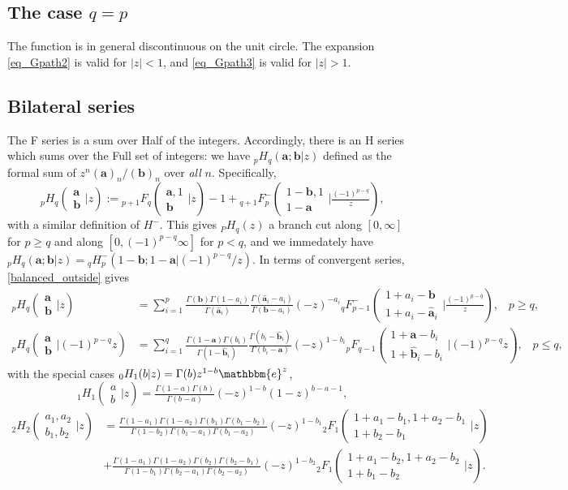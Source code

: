 \documentclass[12pt]{article}
\newcommand{\ee}[0] {\mathbbm{e}}
\numberwithin{equation}{section}
\newcommand{\Head}[3] {{}_{#1}{#2}_{#3}}
\newcommand{\ArgS}[3] {( \begin{smallmatrix} #1 \\ #2 \end{smallmatrix} | {#3})}
\newcommand{\bfa}[0] {\mathbf{a}}
\newcommand{\bfb}[0] {\mathbf{b}}
\begin{document}
\subsection{The case $q=p$}
The function is in general discontinuous on the unit circle. The expansion \eqref{eq_Gpath2} is valid for $|z| < 1$, and \eqref{eq_Gpath3} is valid for $|z| > 1$.



\subsection{Bilateral series}
\label{section_bilateral}
The F series is a sum over Half of the integers. Accordingly, there is an H series which sums over the Full set of integers: we have ${}_p H_q(\bfa; \bfb|z)$ defined as the formal sum of $z^n (\bfa)_n/(\bfb)_n$ over \emph{all} $n$. Specifically,
\begin{equation*}
\Head{p}{H}{q} \ArgS{\bfa}{\bfb}{z} := \Head{p+1}{F}{q} \ArgS{\bfa,1}{\bfb}{z}-1 + \Head{q+1}{F}{p}^{-} \ArgS{1-\bfb,1}{1-\bfa}{\tfrac{(-1)^{p-q}}{z}} \text{,}
\end{equation*}
with a similar definition of $H^{-}$. This gives $\Head{P}{H}{q}(z)$ a branch cut along $[0,\infty]$ for $p\ge q$ and along $[0,(-1)^{p-q} \infty]$ for $p < q$, and we immedately have $\Head{p}{H}{q}(\bfa; \bfb | z) = \Head{q}{H}{p}^{-} (1-\bfb; 1-\bfa | (-1)^{p-q}/z)$. In terms of convergent series, \eqref{balanced_outside} gives
\begin{align*}
\Head{p}{H}{q} \ArgS{\bfa}{\bfb}{z} &= \sum_{i=1}^p \tfrac{\Gamma(\bfb)\Gamma(1-a_i)}{\Gamma(\hat{\bfa}_i)}\tfrac{\Gamma(\hat{\bfa}_i-a_i)}{\Gamma(\bfb-a_i)} (-z)^{-a_i} \Head{q}{F}{p-1}^{-} \ArgS{1+a_i-\bfb}{1+a_i-\hat{\bfa}_i}{\tfrac{(-1)^{p-q}}{z}}\text{,} \quad p \ge q \text{,}\\
\Head{p}{H}{q} \ArgS{\bfa}{\bfb}{(-1)^{p-q}z} &= \sum_{i=1}^q \tfrac{\Gamma(1-\bfa)\Gamma(b_i)}{\Gamma(1-\hat{\bfb}_i)}\tfrac{\Gamma(b_i-\hat{\bfb}_i)}{\Gamma(b_i-\bfa)} (-z)^{1-b_i} \Head{p}{F}{q-1} \ArgS{1+\bfa-b_i}{1+\hat{\bfb}_i-b_i}{(-1)^{p-q}z}\text{,} \quad p \le q \text{,}
\end{align*}
with the special cases ${}_0 H_1(b|z) = \Gamma(b) z^{1-b} \ee^{z}$,
 \begin{equation}
\label{equ_1H1}
\Head1H1 \ArgS{a}{b}{z} = \tfrac{\Gamma(1-a)\Gamma(b)}{\Gamma(b-a)} (-z)^{1-b}(1-z)^{b-a-1}\text{,}
\end{equation}
\begin{equation}
\label{equ_2H2}
\begin{aligned}
\Head2H2 \ArgS{a_1,a_2}{b_1,b_2}{z} &= \tfrac{\Gamma(1-a_1)\Gamma(1-a_2)\Gamma(b_1)\Gamma(b_1-b_2)}{\Gamma(1-b_2)\Gamma(b_1-a_1)\Gamma(b_1-a_2)} (-z)^{1-b_1} \Head2F1 \ArgS{1+a_1-b_1,1+a_2-b_1}{1+b_2-b_1}{z}\\
&+ \tfrac{\Gamma(1-a_1)\Gamma(1-a_2)\Gamma(b_2)\Gamma(b_2-b_1)}{\Gamma(1-b_1)\Gamma(b_2-a_1)\Gamma(b_2-a_2)} (-z)^{1-b_2} \Head2F1 \ArgS{1+a_1-b_2,1+a_2-b_2}{1+b_1-b_2}{z}\text{.}
\end{aligned}
\end{equation}
\end{document}
